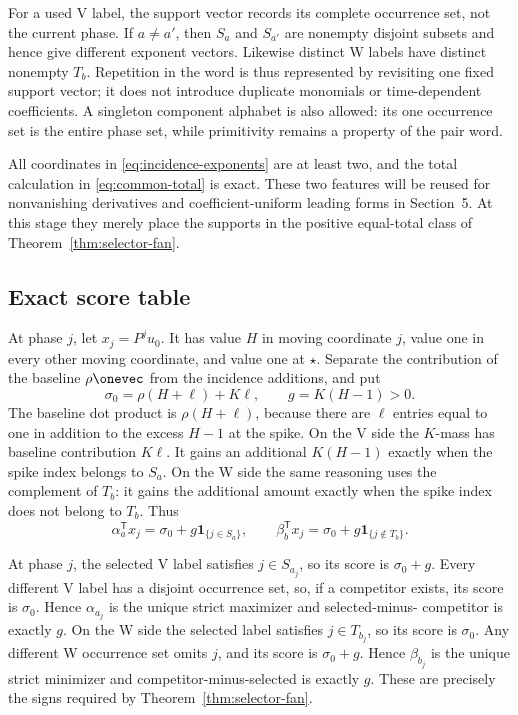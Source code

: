 \documentclass[11pt,letterpaper]{article}
\theoremstyle{definition}
\theoremstyle{remark}
\numberwithin{equation}{section}
\begin{document}
For a used V label, the support vector records its complete occurrence set,
not the current phase.  If \(a\neq a'\), then \(S_a\) and \(S_{a'}\) are
nonempty disjoint subsets and hence give different exponent vectors.
Likewise distinct W labels have distinct nonempty \(T_b\).  Repetition in
the word is thus represented by revisiting one fixed support vector; it does
not introduce duplicate monomials or time-dependent coefficients.  A
singleton component alphabet is also allowed: its one occurrence set is the
entire phase set, while primitivity remains a property of the pair word.

All coordinates in \eqref{eq:incidence-exponents} are at least two, and the
total calculation in \eqref{eq:common-total} is exact.  These two features
will be reused for nonvanishing derivatives and coefficient-uniform leading
forms in Section~5.  At this stage they merely place the supports in the
positive equal-total class of Theorem~\ref{thm:selector-fan}.

\subsection{Exact score table}

At phase \(j\), let \(x_j=P^ju_0\).  It has value \(H\) in moving
coordinate \(j\), value one in every other moving coordinate, and value one
at \(\star\).  Separate the contribution of the baseline \(\rho\onevec\)
from the incidence additions, and put
\begin{equation}
 \sigma_0=\rho(H+\ell)+K\ell,
 \qquad
 g=K(H-1)>0.
 \label{eq:score-constants}
\end{equation}
The baseline dot product is \(\rho(H+\ell)\), because there are \(\ell\)
entries equal to one in addition to the excess \(H-1\) at the spike.  On
the V side the \(K\)-mass has baseline contribution \(K\ell\).  It gains an
additional \(K(H-1)\) exactly when the spike index belongs to \(S_a\).  On
the W side the same reasoning uses the complement of \(T_b\): it gains the
additional amount exactly when the spike index does not belong to \(T_b\).
Thus
\begin{equation}
 \alpha_a^{\mathsf T}x_j
   =\sigma_0+g\mathbf1_{\{j\in S_a\}},
 \qquad
 \beta_b^{\mathsf T}x_j
   =\sigma_0+g\mathbf1_{\{j\notin T_b\}}.
 \label{eq:score-table}
\end{equation}

At phase \(j\), the selected V label satisfies \(j\in S_{a_j}\), so its
score is \(\sigma_0+g\).  Every different V label has a disjoint occurrence set,
so, if a competitor exists, its score is \(\sigma_0\).  Hence
\(\alpha_{a_j}\) is the unique strict maximizer and selected-minus-
competitor is exactly \(g\).  On the W side the selected label satisfies
\(j\in T_{b_j}\), so its score is \(\sigma_0\).  Any different W occurrence set
omits \(j\), and its score is \(\sigma_0+g\).  Hence \(\beta_{b_j}\) is the
unique strict minimizer and competitor-minus-selected is exactly \(g\).
These are precisely the signs required by Theorem~\ref{thm:selector-fan}.
\end{document}
